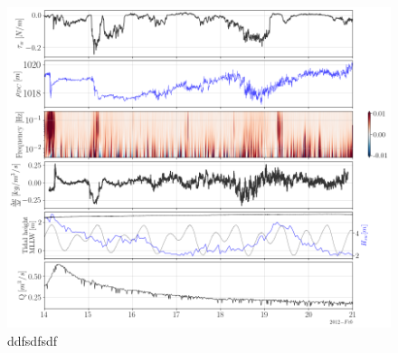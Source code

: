 \documentclass[tesis.tex]{subfiles}
\begin{document}
\begin{figure}[h!]
    \centering
    \includegraphics[width=\textwidth]{Imagenes/mix_wo.png}
    \caption{ddfsdfsdf }
    \label{fig:mix_wo}
\end{figure}
\end{document}
